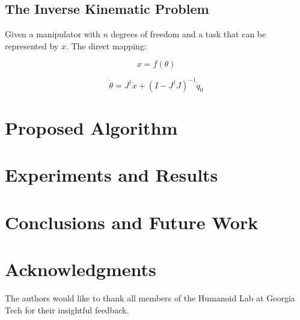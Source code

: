 \documentclass[conference]{IEEEtran}
\newcommand{\Jps}{ \ensuremath{J^{\dagger}} }
\newcommand{\dx}{ \ensuremath{\dot{x}} }
\newcommand{\dt}{ \ensuremath{\dot{\theta}} }
\begin{document}
\subsection{The Inverse Kinematic Problem}
Given a manipulator with $n$ degrees of freedom and a task that
can be represented by $x$. The direct mapping:

\begin{equation}
x = f(\theta) 
\label{eq:DK}
\end{equation}

\begin{equation}
\dt = \Jps \dx + (I - \Jps J)^{-1}\dot{q}_{0}
\label{eq:IK_MinNorm_Solution}
\end{equation}



\section{Proposed Algorithm}
\label{sec:ProposedAlgorithm}


\section{Experiments and Results}
\label{sec:Experiments}


\section{Conclusions and Future Work}
\label{sec:Conclusions}


\section*{Acknowledgments}
The authors would like to thank all members of the Humanoid Lab
at Georgia Tech for their insightful feedback.



\end{document}
